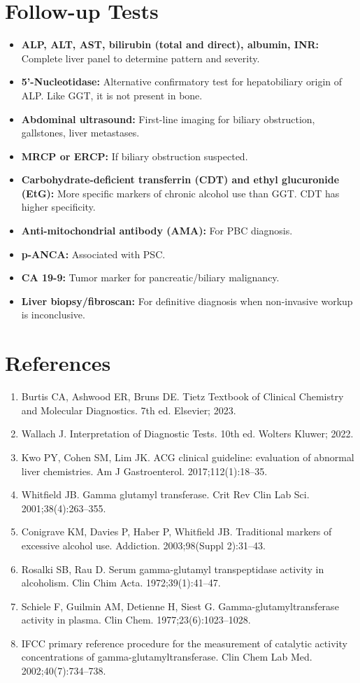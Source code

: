 \section*{Follow-up Tests}
\begin{itemize}
  \item \textbf{ALP, ALT, AST, bilirubin (total and direct), albumin, INR:} Complete liver panel to determine pattern and severity.
  \item \textbf{5'-Nucleotidase:} Alternative confirmatory test for hepatobiliary origin of ALP. Like GGT, it is not present in bone.
  \item \textbf{Abdominal ultrasound:} First-line imaging for biliary obstruction, gallstones, liver metastases.
  \item \textbf{MRCP or ERCP:} If biliary obstruction suspected.
  \item \textbf{Carbohydrate-deficient transferrin (CDT) and ethyl glucuronide (EtG):} More specific markers of chronic alcohol use than GGT. CDT has higher specificity.
  \item \textbf{Anti-mitochondrial antibody (AMA):} For PBC diagnosis.
  \item \textbf{p-ANCA:} Associated with PSC.
  \item \textbf{CA 19-9:} Tumor marker for pancreatic/biliary malignancy.
  \item \textbf{Liver biopsy/fibroscan:} For definitive diagnosis when non-invasive workup is inconclusive.
\end{itemize}

\section*{References}
\begin{enumerate}
  \item Burtis CA, Ashwood ER, Bruns DE. Tietz Textbook of Clinical Chemistry and Molecular Diagnostics. 7th ed. Elsevier; 2023.
  \item Wallach J. Interpretation of Diagnostic Tests. 10th ed. Wolters Kluwer; 2022.
  \item Kwo PY, Cohen SM, Lim JK. ACG clinical guideline: evaluation of abnormal liver chemistries. Am J Gastroenterol. 2017;112(1):18--35.
  \item Whitfield JB. Gamma glutamyl transferase. Crit Rev Clin Lab Sci. 2001;38(4):263--355.
  \item Conigrave KM, Davies P, Haber P, Whitfield JB. Traditional markers of excessive alcohol use. Addiction. 2003;98(Suppl 2):31--43.
  \item Rosalki SB, Rau D. Serum gamma-glutamyl transpeptidase activity in alcoholism. Clin Chim Acta. 1972;39(1):41--47.
  \item Schiele F, Guilmin AM, Detienne H, Siest G. Gamma-glutamyltransferase activity in plasma. Clin Chem. 1977;23(6):1023--1028.
  \item IFCC primary reference procedure for the measurement of catalytic activity concentrations of gamma-glutamyltransferase. Clin Chem Lab Med. 2002;40(7):734--738.
\end{enumerate}

\clearpage
